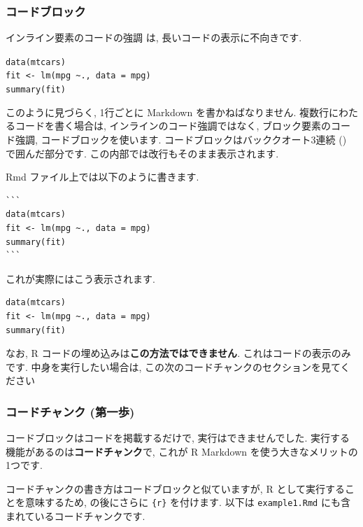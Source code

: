 \documentclass[
]{ltjsarticle}
\begin{document}
\hypertarget{ux30b3ux30fcux30c9ux30d6ux30edux30c3ux30af}{%
\subsubsection{コードブロック}\label{ux30b3ux30fcux30c9ux30d6ux30edux30c3ux30af}}

インライン要素のコードの強調 \texttt{\textasciigrave{}} は, 長いコードの表示に不向きです.

\texttt{data(mtcars)}~\\
\texttt{fit\ \textless{}-\ lm(mpg\ \textasciitilde{}.,\ data\ =\ mpg)}~\\
\texttt{summary(fit)}

このように見づらく, 1行ごとに Markdown を書かねばなりません. 複数行にわたるコードを書く場合は, インラインのコード強調ではなく, ブロック要素のコード強調, コードブロックを使います. コードブロックはバッククオート3連続 (\texttt{\textasciigrave{}\textasciigrave{}\textasciigrave{}}) で囲んだ部分です. この内部では改行もそのまま表示されます.

Rmd ファイル上では以下のように書きます.

\begin{verbatim}
```
data(mtcars)
fit <- lm(mpg ~., data = mpg)
summary(fit)
```
\end{verbatim}

これが実際にはこう表示されます.

\begin{verbatim}
data(mtcars)
fit <- lm(mpg ~., data = mpg)
summary(fit)
\end{verbatim}

なお, R コードの埋め込みは\textbf{この方法ではできません}. これはコードの表示のみです. 中身を実行したい場合は, この次のコードチャンクのセクションを見てください

\hypertarget{code-chunk-init}{%
\subsubsection{コードチャンク (第一歩)}\label{code-chunk-init}}

コードブロックはコードを掲載するだけで, 実行はできませんでした. 実行する機能があるのは\textbf{コードチャンク}で, これが R Markdown を使う大きなメリットの1つです.

コードチャンクの書き方はコードブロックと似ていますが, R として実行することを意味するため, \texttt{\textasciigrave{}\textasciigrave{}\textasciigrave{}} の後にさらに \texttt{\{r\}} を付けます. 以下は \texttt{example1.Rmd} にも含まれているコードチャンクです.
\end{document}
